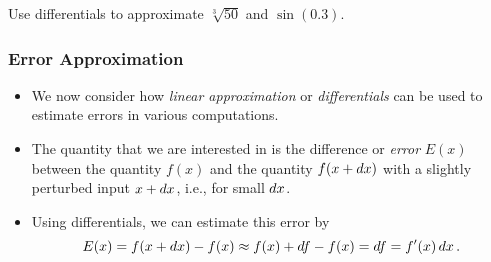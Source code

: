 \documentclass[10pt,t,handout,ignorenonframetext,aspectratio=169]{beamer}
\begin{document}
\begin{frame}
  \vs{}
  \question{} Use differentials to approximate $\sqrt[3]{50}$ and $\sin(0.3)$.
\end{frame}

\begin{frame}
  \frametitle{Error Approximation}
  \begin{itemize}
  \item We now consider how \textit{linear approximation} or
    \textit{differentials} can be used to estimate errors in various
    computations.
  \item The quantity that we are interested in is the difference or
    \textit{error} $E(x)$ between the quantity $f(x)$ and the quantity
    $f(x+\mathop{}\!d x)$ with a slightly perturbed input $x+\mathop{}\!d x$, i.e., for
    small $\mathop{}\!d x$.
  \item Using differentials, we can estimate this error by
    \[
      E(x) = f(x+\mathop{}\!d x) - f(x)
      \approx f(x) + \mathop{}\!d f - f(x) = \mathop{}\!d f = f'(x) \mathop{}\!d x \,.
    \]
  \end{itemize}
\end{frame}
\end{document}
